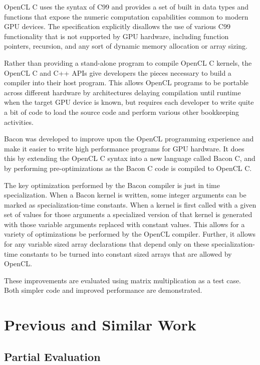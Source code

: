 \documentclass{llncs}
\begin{document}
OpenCL C uses the syntax of C99 and provides a set of built in data
types and functions that expose the numeric computation capabilities
common to modern GPU devices. The specification explicitly disallows
the use of various C99 functionality that is not supported by GPU
hardware, including function pointers, recursion, and any sort of
dynamic memory allocation or array sizing. 

Rather than providing a stand-alone program to compile OpenCL C
kernels, the OpenCL C and C++ APIs give developers the pieces
necessary to build a compiler into their host program. This allows OpenCL
programs to be portable across different hardware by architectures
delaying compilation until runtime when the target GPU device is
known, but requires each developer to write quite a bit of code to
load the source code and perform various other bookkeeping activities.

Bacon was developed to improve upon the OpenCL programming
experience and make it easier to write high performance programs for
GPU hardware. It does this by extending the OpenCL C syntax into a new
language called Bacon C, and by performing pre-optimizations as
the Bacon C code is compiled to OpenCL C.

The key optimization performed by the Bacon compiler is just in time
specialization. When a Bacon kernel is written, some integer arguments
can be marked as specialization-time constants. When a kernel is first
called with a given set of values for those arguments a specialized
version of that kernel is generated with those variable arguments
replaced with constant values. This allows for a variety of
optimizations be performed by the OpenCL compiler. Further, it allows
for any variable sized array declarations that depend only on these
specialization-time constants to be turned into constant sized arrays
that are allowed by OpenCL.

These improvements are evaluated using matrix multiplication as a test
case. Both simpler code and improved performance are demonstrated.

\section{Previous and Similar Work}

\subsection{Partial Evaluation}
\end{document}
